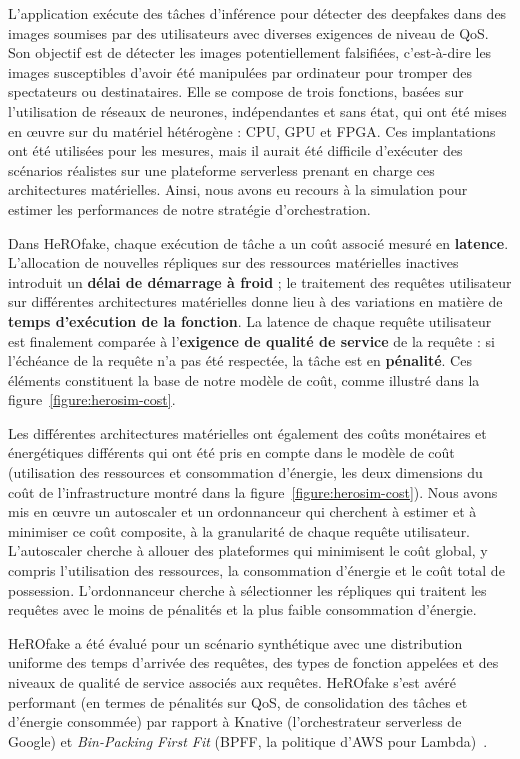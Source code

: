 L'application exécute des tâches d'inférence pour détecter des deepfakes dans des images soumises par des utilisateurs avec diverses exigences de niveau de \gls{QoS}. Son objectif est de détecter les images potentiellement falsifiées, c'est-à-dire les images susceptibles d'avoir été manipulées par ordinateur pour tromper des spectateurs ou destinataires. Elle se compose de trois fonctions, basées sur l'utilisation de réseaux de neurones, indépendantes et sans état, qui ont été mises en œuvre sur du matériel hétérogène : \gls{CPU}, \gls{GPU} et \gls{FPGA}. Ces implantations ont été utilisées pour les mesures, mais il aurait été difficile d'exécuter des scénarios réalistes sur une plateforme serverless prenant en charge ces architectures matérielles. Ainsi, nous avons eu recours à la simulation pour estimer les performances de notre stratégie d'orchestration.

Dans HeROfake, chaque exécution de tâche a un coût associé mesuré en \textbf{latence}. L'allocation de nouvelles répliques sur des ressources matérielles inactives introduit un \textbf{délai de démarrage à froid} ; le traitement des requêtes utilisateur sur différentes architectures matérielles donne lieu à des variations en matière de \textbf{temps d'exécution de la fonction}. La latence de chaque requête utilisateur est finalement comparée à l'\textbf{exigence de qualité de service} de la requête : si l'échéance de la requête n'a pas été respectée, la tâche est en \textbf{pénalité}. Ces éléments constituent la base de notre modèle de coût, comme illustré dans la figure~\ref{figure:herosim-cost}.

Les différentes architectures matérielles ont également des coûts monétaires et énergétiques différents qui ont été pris en compte dans le modèle de coût (utilisation des ressources et consommation d'énergie, les deux dimensions du coût de l'infrastructure montré dans la figure~\ref{figure:herosim-cost}). Nous avons mis en œuvre un autoscaler et un ordonnanceur qui cherchent à estimer et à minimiser ce coût composite, à la granularité de chaque requête utilisateur. L'autoscaler cherche à allouer des plateformes qui minimisent le coût global, y compris l'utilisation des ressources, la consommation d'énergie et le coût total de possession. L'ordonnanceur cherche à sélectionner les répliques qui traitent les requêtes avec le moins de pénalités et la plus faible consommation d'énergie.

HeROfake a été évalué pour un scénario synthétique avec une distribution uniforme des temps d'arrivée des requêtes, des types de fonction appelées et des niveaux de qualité de service associés aux requêtes. HeROfake s'est avéré performant (en termes de pénalités sur \gls{QoS}, de consolidation des tâches et d'énergie consommée) par rapport à Knative (l'orchestrateur serverless de Google) et \textit{Bin-Packing First Fit} (\gls{BPFF}, la politique d'\gls{AWS} pour Lambda)~\cite{herofake}.

